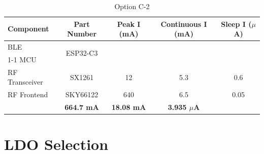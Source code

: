 \documentclass{article}
\begin{document}
\begin{table}[h]
\begin{minipage}{\textwidth}
\centering
\caption*{Option C-2}
\begin{tabular}{|l|c|c|c|c|}
\hline
\textbf{Component} & \textbf{Part Number} & \textbf{Peak I (mA)} & \textbf{Continuous I (mA)} & \textbf{Sleep I ($\mu$A)} \\
\hline
BLE & \multirow{2}{*}{ESP32-C3} & & &  \\
\cline{1-1}\cline{3-5}
MCU &  &  &  &  \\
\hline
RF Transceiver & SX1261 & 12 & 5.3 & 0.6 \\
\hline
RF Frontend & SKY66122 & 640 & 6.5 & 0.05 \\
\Xhline{5\arrayrulewidth}
\multicolumn{2}{|c|}{\textbf{Total}} & \textbf{664.7 mA} & \textbf{18.08 mA} & \textbf{3.935 $\mu$A} \\
\hline

\end{tabular}
\end{minipage}
\end{table}

\newpage
\section{LDO Selection}
\end{document}
